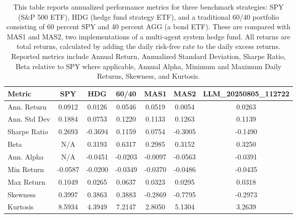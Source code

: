 \begin{table}[htbp]
\centering
\begin{tabular}{lcccccc}
\toprule
Metric & SPY & HDG & 60/40 & MAS1 & MAS2 & LLM_20250805_112722 \\
\midrule
Ann. Return & 0.0912 & 0.0126 & 0.0546 & 0.0519 & 0.0054 & 0.0263 \\
Ann. Std Dev & 0.1884 & 0.0753 & 0.1220 & 0.1133 & 0.1263 & 0.1139 \\
Sharpe Ratio & 0.2693 & -0.3694 & 0.1159 & 0.0754 & -0.3005 & -0.1490 \\
Beta & N/A & 0.3193 & 0.6317 & 0.2985 & 0.3152 & 0.3250 \\
Ann. Alpha & N/A & -0.0451 & -0.0203 & -0.0097 & -0.0563 & -0.0391 \\
Min Return & -0.0587 & -0.0200 & -0.0349 & -0.0370 & -0.0486 & -0.0435 \\
Max Return & 0.1049 & 0.0265 & 0.0637 & 0.0323 & 0.0295 & 0.0318 \\
Skewness & 0.3997 & 0.3863 & 0.3883 & -0.2869 & -0.7795 & -0.2973 \\
Kurtosis & 8.5934 & 4.3949 & 7.2147 & 2.8050 & 5.1304 & 3.2639 \\
\bottomrule
\end{tabular}
\caption[Performance Summary Statistics]{This table reports annualized performance metrics for three benchmark strategies: SPY (S\&P 500 ETF), HDG (hedge fund strategy ETF), and a traditional 60/40 portfolio consisting of 60 percent SPY and 40 percent AGG (a bond ETF). These are compared with MAS1 and MAS2, two implementations of a multi-agent system hedge fund. All returns are total returns, calculated by adding the daily risk-free rate to the daily excess returns. Reported metrics include Annual Return, Annualized Standard Deviation, Sharpe Ratio, Beta relative to SPY where applicable, Annual Alpha, Minimum and Maximum Daily Returns, Skewness, and Kurtosis.}
\label{tab:performance_summary}
\end{table}